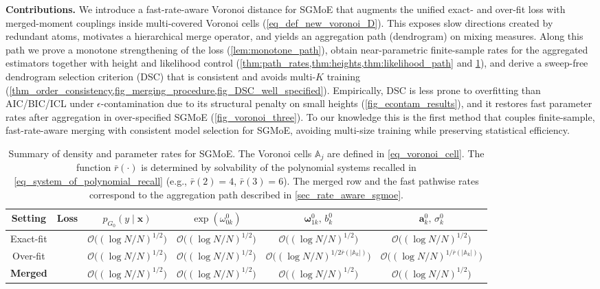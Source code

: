 \documentclass[twoside]{article}
\DeclareMathOperator*{\VDFRA}{D_{FRA}}
\DeclareMathOperator*{\VDO}{D_{O}}
\DeclareMathOperator*{\VDE}{D_{E}}
\theoremstyle{plain}
\theoremstyle{definition}
\theoremstyle{plain}
\def\vomega{{\bm{\omega}}}
\def\va{{\bm{a}}}
\def\vx{{\bm{x}}}
\def\sA{{\mathbb{A}}}
\newcommand{\cO}{\mathcal{O}}
\begin{document}
{\bf Contributions.}
We introduce a fast-rate-aware Voronoi distance for SGMoE that augments the unified exact- and over-fit loss with merged-moment couplings inside multi-covered Voronoi cells (\cref{eq_def_new_voronoi_D}). This exposes slow directions created by redundant atoms, motivates a hierarchical merge operator, and yields an aggregation path (dendrogram) on mixing measures. Along this path we prove a monotone strengthening of the loss (\cref{lem:monotone_path}), obtain near-parametric finite-sample rates for the aggregated estimators together with height and likelihood control (\cref{thm:path_rates,thm:heights,thm:likelihood_path} and \cref{table_parameter_rates}), and derive a sweep-free dendrogram selection criterion (DSC) that is consistent and avoids multi-\(K\) training (\cref{thm_order_consistency,fig_merging_procedure,fig_DSC_well_specified}). Empirically, DSC is less prone to overfitting than AIC/BIC/ICL under \(\epsilon\)-contamination due to its structural penalty on small heights (\cref{fig_econtam_results}), and it restores fast parameter rates after aggregation in over-specified SGMoE (\cref{fig_voronoi_three}). To our knowledge this is the first method that couples finite-sample, fast-rate-aware merging with consistent model selection for SGMoE, avoiding multi-size training while preserving statistical efficiency.
\begin{table}[!ht]
\caption{Summary of density and parameter rates for SGMoE. The Voronoi cells $\sA_j$ are defined in \cref{eq_voronoi_cell}. The function $\bar r(\cdot)$ is determined by solvability of the polynomial systems recalled in \cref{eq_system_of_polynomial_recall} (e.g., $\bar r(2)=4$, $\bar r(3)=6$). The merged row and the fast pathwise rates correspond to the aggregation path described in \cref{sec_rate_aware_sgmoe}.}
\centering
\begin{tabular}{|c|c|c|c|c|c|}
\hline
\textbf{Setting} & \textbf{Loss} & $p_{G_0}(y\mid \vx)$ & $\exp(\omega_{0k}^{0})$ & $\vomega_{1k}^{0},\, b_{k}^{0}$ & $\va_{k}^{0},\, \sigma_{k}^{0}$ \\
\hline
Exact-fit & $\VDE$ & $\cO\!\big((\log N/N)^{1/2}\big)$ & $\cO\!\big((\log N/N)^{1/2}\big)$ & $\cO\!\big((\log N/N)^{1/2}\big)$ & $\cO\!\big((\log N/N)^{1/2}\big)$ \\
\hline
Over-fit& $\VDO$ & $\cO\!\big((\log N/N)^{1/2}\big)$ & $\cO\!\big((\log N/N)^{1/2}\big)$ & $\cO\!\big((\log N/N)^{1/{2\bar r(|\sA_k|)}}\big)$ & $\cO\!\big((\log N/N)^{1/{\bar r(|\sA_k|)}}\big)$ \\
\hline
{\bf Merged} & $\VDFRA$ & $\cO\!\big((\log N/N)^{1/2}\big)$ & $\cO\!\big((\log N/N)^{1/2}\big)$ & $\cO\!\big((\log N/N)^{1/2}\big)$ & $\cO\!\big((\log N/N)^{1/2}\big)$ \\
\hline
\end{tabular}
\label{table_parameter_rates}
\end{table}
\end{document}
